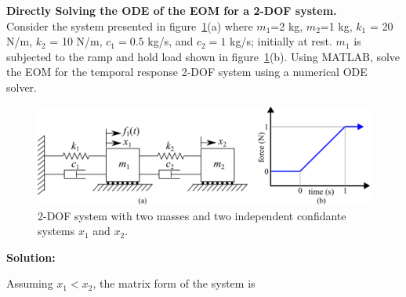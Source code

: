 \documentclass[12pt,letter]{article}
\begin{document}
	
	\begin{example}
	\textbf{Directly Solving the ODE of the EOM for a 2-DOF system.} \\

	\noindent Consider the system presented in figure~\ref{fig:2-DOF-spring_mass_dashpot_horizontal_forced_ramp_function}(a) where $m_1$=2 kg, $m_2$=1 kg, $k_1$ = 20 N/m, $k_2$ = 10 N/m, $c_1=0.5$ kg/s, and $c_2=1$ kg/s; initially at rest. $m_1$ is subjected to the ramp and hold load shown in figure~\ref{fig:2-DOF-spring_mass_dashpot_horizontal_forced_ramp_function}(b). 	Using MATLAB, solve the EOM for the temporal response 2-DOF system using a numerical ODE solver.

			\begin{figure}[H]
				\centering
				\includegraphics[width=\linewidth]{../figures/2-DOF-spring_mass_dashpot_horizontal_forced_ramp_function}
				\caption{2-DOF system with two masses and two independent confidante systems $x_1$ and $x_2$.}
				\label{fig:2-DOF-spring_mass_dashpot_horizontal_forced_ramp_function}
			\end{figure}
			
			
\noindent \textbf{Solution:} 
	
\noindent Assuming $x_1<x_2$, the matrix form of the system is
	

\end{example}
\end{document}
